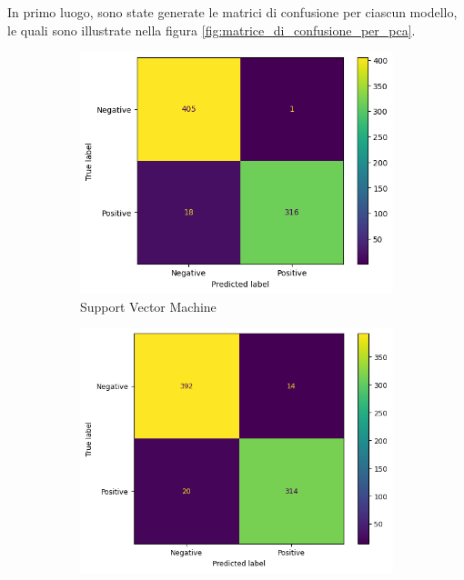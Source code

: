 In primo luogo, sono state generate le matrici di confusione per ciascun
modello, le quali sono illustrate nella figura \ref{fig:matrice_di_confusione_per_pca}.
\begin{figure}[!ht]
    \centering
    \begin{subfigure}{.3\textwidth}
        \centering
        \includegraphics[width=\textwidth]{img/svm/matrice_confusione_pca.png}
        \caption{Support Vector Machine}
        \label{fig:matrice_di_confusione_per_SVM_pca}
    \end{subfigure}
    \hfill
    \begin{subfigure}{.3\textwidth}
        \centering
        \includegraphics[width=\textwidth]{img/gnb/confusion_matrix_pca.png}

\end{subfigure}
\end{figure}
